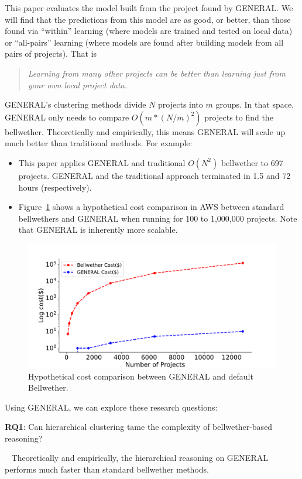 \documentclass[10pt,journal,compsoc]{IEEEtran}
\newcommand{\bi}{\begin{itemize}}
\newcommand{\ei}{\end{itemize}}
\newenvironment{RQ}[1]%
{\noindent\begin{minipage}[c]{\linewidth}%
\begin{bclogo}[couleur=gray!20,%
                arrondi=0.1,logo=\bctrombone,%
                ombre=true%
                ]{{\small  ~#1}}}%
{\end{bclogo}\vspace{2mm}\end{minipage}}
\begin{document}
 This paper evaluates the model built from the project   found by GENERAL. 
 We will find that  the predictions
 from this model  are as good, or better,
 than those found  via ``within'' learning (where models are trained and tested on local data)
 or ``all-pairs'' learning (where models are found after building models from all pairs of projects).
   That is
\begin{quote}
{\em 
Learning from many other projects can be better than learning just from your own local project data.
}\end{quote}
GENERAL's clustering methods divide $N$ projects into $m$ groups. In that space,   GENERAL only needs
to compare $O(m*(N/m)^2)$  projects to find the bellwether. Theoretically and empirically, 
this means GENERAL will scale up much better than traditional   methods.
For example:
\bi
\item
This paper applies GENERAL and traditional $O(N^2)$ bellwether to 697 projects.
GENERAL and the traditional approach terminated in 1.5 and 72 hours (respectively).

\item 
 Figure~\ref{fig:cost} shows a hypothetical cost comparison in AWS between standard bellwethers and   GENERAL when running for 100 to 1,000,000 projects. Note that GENERAL
 is inherently more scalable.
 \ei
\begin{figure}[!t]
    \centering
    \includegraphics[width=\linewidth]{figs/cost.pdf}
    \caption{Hypothetical cost comparison between GENERAL and default Bellwether.}
    \label{fig:cost}
\end{figure} 
Using GENERAL, we can  explore these research questions:

 
            \textbf{RQ1}:   Can hierarchical clustering tame the complexity of bellwether-based reasoning?
            
            \begin{RQ}{
               Theoretically and empirically, the 
hierarchical
reasoning on GENERAL performs much
faster than standard bellwether methods.}
            \end{RQ}
\end{document}
